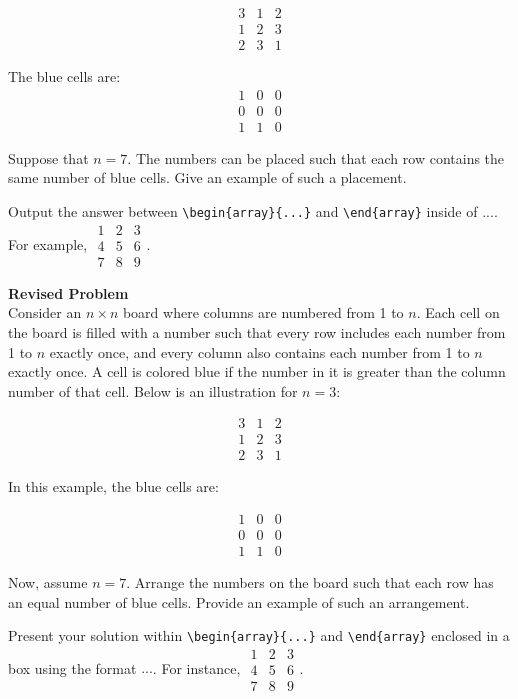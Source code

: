 $$\begin{array}{ccc}
3 & 1 & 2 \\
1 & 2 & 3 \\
2 & 3 & 1
\end{array}$$

The blue cells are:
$$\begin{array}{ccc}
1 & 0 & 0 \\
0 & 0 & 0 \\
1 & 1 & 0
\end{array}$$

Suppose that $n = 7$. The numbers can be placed such that each row contains the same number of blue cells. Give an example of such a placement.

Output the answer between \verb|\begin{array}{...}| and \verb|\end{array}| inside of $\boxed{...}$. For example, $\boxed{\begin{array}{ccc}1 & 2 & 3 \\ 4 & 5 & 6 \\ 7 & 8 & 9\end{array}}$.

\textbf{Revised Problem}\\
Consider an \(n \times n\) board where columns are numbered from 1 to \(n\). Each cell on the board is filled with a number such that every row includes each number from 1 to \(n\) exactly once, and every column also contains each number from 1 to \(n\) exactly once. A cell is colored blue if the number in it is greater than the column number of that cell. Below is an illustration for \(n = 3\):

$$\begin{array}{ccc}
3 & 1 & 2 \\
1 & 2 & 3 \\
2 & 3 & 1
\end{array}$$

In this example, the blue cells are:

$$\begin{array}{ccc}
1 & 0 & 0 \\
0 & 0 & 0 \\
1 & 1 & 0
\end{array}$$

Now, assume \(n = 7\). Arrange the numbers on the board such that each row has an equal number of blue cells. Provide an example of such an arrangement.

Present your solution within \verb|\begin{array}{...}| and \verb|\end{array}| enclosed in a box using the format $\boxed{...}$. For instance, $\boxed{\begin{array}{ccc}1 & 2 & 3 \\ 4 & 5 & 6 \\ 7 & 8 & 9\end{array}}$.

